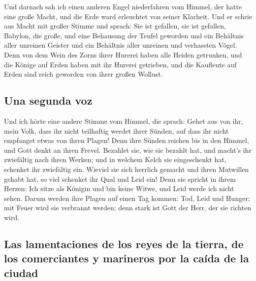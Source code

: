  Und darnach sah ich einen anderen Engel niederfahren vom
Himmel, der hatte eine große Macht, und die Erde ward erleuchtet von
seiner Klarheit.  Und er schrie aus Macht mit großer
Stimme und sprach: Sie ist gefallen, sie ist gefallen, Babylon, die
große, und eine Behausung der Teufel geworden und ein Behältnis aller
unreinen Geister und ein Behältnis aller unreinen und verhassten Vögel.
 Denn von dem Wein des Zorns ihrer Hurerei haben alle
Heiden getrunken, und die Könige auf Erden haben mit ihr Hurerei
getrieben, und die Kaufleute auf Erden sind reich geworden von ihrer
großen Wollust.

\hypertarget{una-segunda-voz}{%
\subsection{Una segunda voz}\label{una-segunda-voz}}

 Und ich hörte eine andere Stimme vom Himmel, die sprach:
Gehet aus von ihr, mein Volk, dass ihr nicht teilhaftig werdet ihrer
Sünden, auf dass ihr nicht empfanget etwas von ihren Plagen!
 Denn ihre Sünden reichen bis in den Himmel, und Gott
denkt an ihren Frevel.  Bezahlet sie, wie sie bezahlt hat,
und macht's ihr zwiefältig nach ihren Werken; und in welchem Kelch sie
eingeschenkt hat, schenket ihr zwiefältig ein.  Wieviel
sie sich herrlich gemacht und ihren Mutwillen gehabt hat, so viel
schenket ihr Qual und Leid ein! Denn sie spricht in ihrem Herzen: Ich
sitze als Königin und bin keine Witwe, und Leid werde ich nicht sehen.
 Darum werden ihre Plagen auf einen Tag kommen: Tod, Leid
und Hunger; mit Feuer wird sie verbrannt werden; denn stark ist Gott der
Herr, der sie richten wird.

\hypertarget{las-lamentaciones-de-los-reyes-de-la-tierra-de-los-comerciantes-y-marineros-por-la-cauxedda-de-la-ciudad}{%
\subsection{Las lamentaciones de los reyes de la tierra, de los
comerciantes y marineros por la caída de la
ciudad}\label{las-lamentaciones-de-los-reyes-de-la-tierra-de-los-comerciantes-y-marineros-por-la-cauxedda-de-la-ciudad}}

